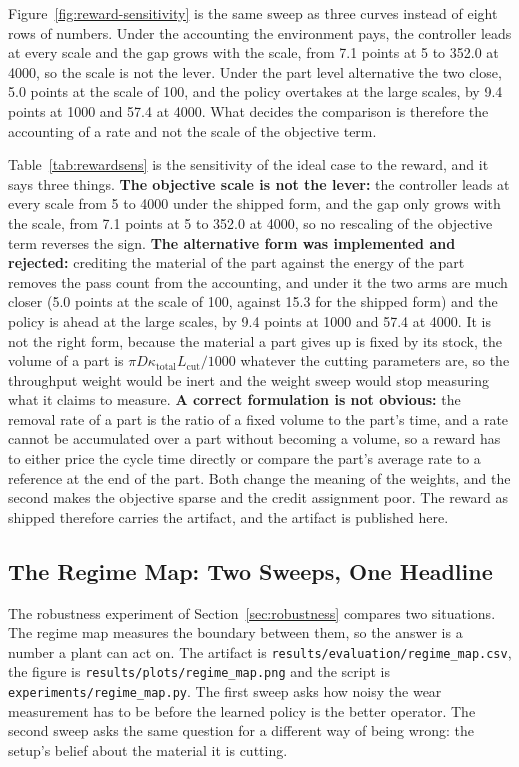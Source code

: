 \documentclass[11pt,a4paper]{article}
\begin{document}
Figure~\ref{fig:reward-sensitivity} is the same sweep as three curves instead of eight rows of numbers. Under the accounting the environment pays, the controller leads at every scale and the gap grows with the scale, from 7.1 points at 5 to 352.0 at 4000, so the scale is not the lever. Under the part level alternative the two close, 5.0 points at the scale of 100, and the policy overtakes at the large scales, by 9.4 points at 1000 and 57.4 at 4000. What decides the comparison is therefore the accounting of a rate and not the scale of the objective term.

Table~\ref{tab:rewardsens} is the sensitivity of the ideal case to the reward, and it says three things. \textbf{The objective scale is not the lever:} the controller leads at every scale from 5 to 4000 under the shipped form, and the gap only grows with the scale, from 7.1 points at 5 to 352.0 at 4000, so no rescaling of the objective term reverses the sign. \textbf{The alternative form was implemented and rejected:} crediting the material of the part against the energy of the part removes the pass count from the accounting, and under it the two arms are much closer (5.0 points at the scale of 100, against 15.3 for the shipped form) and the policy is ahead at the large scales, by 9.4 points at 1000 and 57.4 at 4000. It is not the right form, because the material a part gives up is fixed by its stock, the volume of a part is $\pi D \kappa_\text{total} L_\text{cut}/1000$ whatever the cutting parameters are, so the throughput weight would be inert and the weight sweep would stop measuring what it claims to measure. \textbf{A correct formulation is not obvious:} the removal rate of a part is the ratio of a fixed volume to the part's time, and a rate cannot be accumulated over a part without becoming a volume, so a reward has to either price the cycle time directly or compare the part's average rate to a reference at the end of the part. Both change the meaning of the weights, and the second makes the objective sparse and the credit assignment poor. The reward as shipped therefore carries the artifact, and the artifact is published here.

\subsection{The Regime Map: Two Sweeps, One Headline}
\label{sec:regimemap}

The robustness experiment of Section~\ref{sec:robustness} compares two situations. The regime map measures the boundary between them, so the answer is a number a plant can act on. The artifact is \texttt{results/\allowbreak evaluation/\allowbreak regime\_map.csv}, the figure is \texttt{results/plots/regime\_map.png} and the script is \texttt{experiments/\allowbreak regime\_map.py}. The first sweep asks how noisy the wear measurement has to be before the learned policy is the better operator. The second sweep asks the same question for a different way of being wrong: the setup's belief about the material it is cutting.
\end{document}
